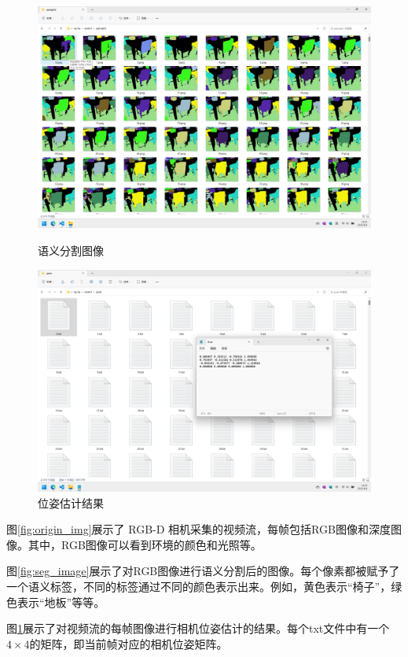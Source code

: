 \begin{figure}[htbp]
	\centering
	\begin{minipage}[t]{0.48\textwidth}
		\centering
		\includegraphics[width=1\textwidth]{figures/scene1_semantic.png}
		\caption{语义分割图像}
		\label{fig:seg_image}
	\end{minipage}
	\begin{minipage}[t]{0.48\textwidth}
		\centering
		\includegraphics[width=1\textwidth]{figures/scene1_pose.png}
		\caption{位姿估计结果}
		\label{fig:pose_eval}
	\end{minipage}
\end{figure}

\par 图\ref{fig:origin_img}展示了 RGB-D 相机采集的视频流，每帧包括RGB图像和深度图像。其中，RGB图像可以看到环境的颜色和光照等。
\par 图\ref{fig:seg_image}展示了对RGB图像进行语义分割后的图像。每个像素都被赋予了一个语义标签，不同的标签通过不同的颜色表示出来。例如，黄色表示“椅子”，绿色表示“地板”等等。
\par 图\ref{fig:pose_eval}展示了对视频流的每帧图像进行相机位姿估计的结果。每个txt文件中有一个$4 \times 4$的矩阵，即当前帧对应的相机位姿矩阵。

